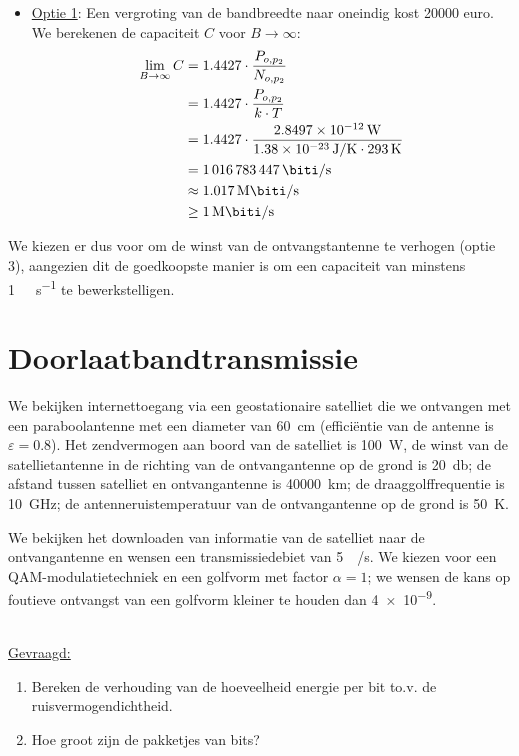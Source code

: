 \documentclass{kuburgiearticle}
\let\epsilon\varepsilon
\begin{document}
\begin{itemize}
		\item \underline{Optie 1}: Een vergroting van de bandbreedte naar oneindig kost 20000 euro. We berekenen de capaciteit \(C\) voor \(B \to \infty\): \begin{align*}
			\lim_{B\to\infty} C &= 1.4427 \cdot \frac{P_{o,p_2}}{N_{o,p_2}}\\
			&= 1.4427 \cdot \frac{P_{o,p_2}}{k \cdot T}\\
			&= 1.4427 \cdot \frac{\SI{2.8497e-12}{\watt}}{\SI{1.38e-23}{\joule/\kelvin}
				 \cdot \SI{293}{\kelvin}}\\
			&= \SI{1016783447}{\biti\per\second}\\
			&\approx \SI{1.017}{\mega\biti\per\second}\\
			&\geq \SI{1}{\mega\biti\per\second}
		\end{align*}
	\end{itemize}

	We kiezen er dus voor om de winst van de ontvangstantenne te verhogen (optie 3), aangezien dit de goedkoopste manier is om een capaciteit van minstens \SI{1}{\mega\biti\per\second} te bewerkstelligen.

	\newpage
	\section{Doorlaatbandtransmissie}

	We bekijken internettoegang via een geostationaire satelliet die we ontvangen met een paraboolantenne met een diameter van \SI{60}{\centi\meter} (efficiëntie van de antenne is \(\epsilon=0.8\)). Het zendvermogen aan boord van de satelliet is \SI{100}{\watt}, de winst van de satellietantenne in de richting van de ontvangantenne op de grond is \SI{20}{\decibel}; de afstand tussen satelliet en ontvangantenne is \SI{40000}{\kilo\meter}; de draaggolffrequentie is \SI{10}{\giga\hertz}; de antenneruistemperatuur van de ontvangantenne op de grond is \SI{50}{\kelvin}.

	We bekijken het downloaden van informatie van de satelliet naar de ontvangantenne en wensen een transmissiedebiet van \SI{5}{\mega\bit/\second}. We kiezen voor een QAM-modulatietechniek en een golfvorm met factor \(\alpha=1\); we wensen de kans op foutieve ontvangst van een golfvorm kleiner te houden dan \SI{4e-9}{}.

	\hfill \\
	\underline{Gevraagd:}
	\begin{enumerate}
		\item Bereken de verhouding van de hoeveelheid energie per bit to.v. de ruisvermogendichtheid.
		\item Hoe groot zijn de pakketjes van bits?
	\end{enumerate}
\end{document}
